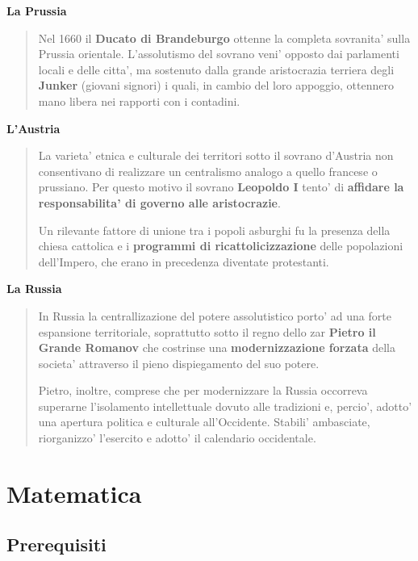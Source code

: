 \documentclass{article}
\begin{document}
{{    \textbf{La Prussia}
    \begin{quote}
      Nel 1660 il \textbf{Ducato di Brandeburgo} ottenne la completa sovranita' sulla Prussia orientale. L'assolutismo del sovrano veni' opposto dai parlamenti locali e delle citta', ma sostenuto dalla grande aristocrazia terriera degli \textbf{Junker} \small{(giovani signori)} i quali, in cambio del loro appoggio, ottennero mano libera nei rapporti con i contadini.
    \end{quote}

    \textbf{L'Austria}
    \begin{quote}
      La varieta' etnica e culturale dei territori sotto il sovrano d'Austria non consentivano di realizzare un centralismo analogo a quello francese o prussiano. Per questo motivo il sovrano \textbf{Leopoldo I} tento' di \textbf{affidare la responsabilita' di governo alle aristocrazie}.

      Un rilevante fattore di unione tra i popoli asburghi fu la presenza della chiesa cattolica e i \textbf{programmi di ricattolicizzazione} delle popolazioni dell'Impero, che erano in precedenza diventate protestanti.
    \end{quote}

    \textbf{La Russia}
    \begin{quote}
      In Russia la centrallizazione del potere assolutistico porto' ad una forte espansione territoriale, soprattutto sotto il regno dello zar \textbf{Pietro il Grande Romanov} che costrinse una \textbf{modernizzazione forzata} della societa' attraverso il pieno dispiegamento del suo potere.

      Pietro, inoltre, comprese che per modernizzare la Russia occorreva superarne l'isolamento intellettuale dovuto alle tradizioni e, percio', adotto' una apertura politica e culturale all'Occidente. Stabili' ambasciate, riorganizzo' l'esercito e adotto' il calendario occidentale.
    \end{quote}
  }

  \section{Matematica}
  {
    \subsection{Prerequisiti}
}}
\end{document}
